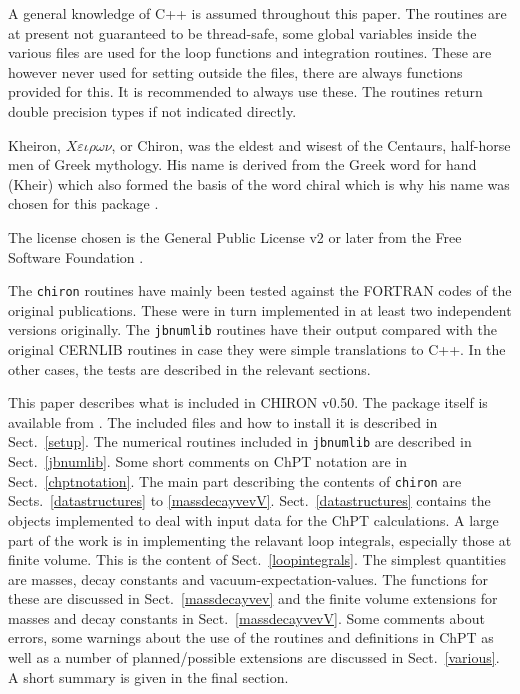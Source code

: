 \documentclass[12pt,a4paper]{article}
\begin{document}
A general knowledge of {\textsc C++} is assumed throughout this paper.
The routines are at present not guaranteed to be thread-safe,
some global variables inside the various files are used
for the loop functions and integration routines. These are however never used
for setting outside the files, there are always functions provided for this.
It is recommended to always use these.
The routines return double precision types if not indicated directly.

Kheiron, $X\varepsilon\iota\rho\omega\nu$, or Chiron, was the eldest and
wisest of the Centaurs, half-horse men of Greek mythology.
His name is derived from the Greek word for hand (Kheir)
which also formed the basis of the word chiral which is why his name was chosen
for this package \cite{chiron}.

The license chosen is the General Public License v2 or later from
the Free Software Foundation \cite{GPLv2}.

The \texttt{chiron} routines have mainly been tested against
the \textsc{FORTRAN}
codes of the original publications. These were in turn implemented
in at least two independent versions originally. 
The \texttt{jbnumlib}
routines have their output compared with the original \textsc{CERNLIB}
routines in case they were simple translations to \textsc{C++}.
In the other cases, the
tests are described in the relevant sections.

This paper describes what is included in \textsc{CHIRON} v0.50.
The package itself is available from \cite{chironsite}.
The included files and how to install it is described in Sect.~\ref{setup}.
The numerical routines included in \texttt{jbnumlib} are described
in Sect.~\ref{jbnumlib}. Some short comments on
ChPT notation are in Sect.~\ref{chptnotation}. The main part
describing the contents of \texttt{chiron} are Sects.~\ref{datastructures}
to \ref{massdecayvevV}. Sect.~\ref{datastructures} contains the objects
implemented to deal with input data for the ChPT calculations.
A large part of the work is in implementing the relavant loop integrals,
especially those at finite volume. This is the content of
Sect.~\ref{loopintegrals}. The simplest quantities
are masses, decay constants and vacuum-expectation-values. 
The functions for these are discussed in Sect.~\ref{massdecayvev}
and the finite volume extensions for masses and decay constants
in Sect.~\ref{massdecayvevV}. Some comments about errors, some warnings
about the use of the routines and definitions in ChPT as well as a number
of planned/possible extensions are discussed in Sect.~\ref{various}.
A short summary is given in the final section.
\end{document}
